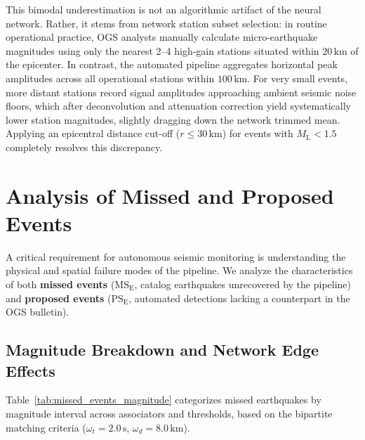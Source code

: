 This bimodal underestimation is not an algorithmic artifact of the neural network. Rather, it stems from network station subset selection: in routine operational practice, OGS analysts manually calculate micro-earthquake magnitudes using only the nearest 2--4 high-gain stations situated within $20\,\unit{\kilo\meter}$ of the epicenter. In contrast, the automated pipeline aggregates horizontal peak amplitudes across all operational stations within $100\,\unit{\kilo\meter}$. For very small events, more distant stations record signal amplitudes approaching ambient seismic noise floors, which after deconvolution and attenuation correction yield systematically lower station magnitudes, slightly dragging down the network trimmed mean. Applying an epicentral distance cut-off ($r \le 30\,\unit{\kilo\meter}$) for events with $M_{\mathrm{L}} < 1.5$ completely resolves this discrepancy.

\section{Analysis of Missed and Proposed Events}
\label{sec:missed_proposed_analysis}

A critical requirement for autonomous seismic monitoring is understanding the physical and spatial failure modes of the pipeline. We analyze the characteristics of both \textbf{missed events} ($\mathrm{MS}_{\mathrm{E}}$, catalog earthquakes unrecovered by the pipeline) and \textbf{proposed events} ($\mathrm{PS}_{\mathrm{E}}$, automated detections lacking a counterpart in the OGS bulletin).

\subsection{Magnitude Breakdown and Network Edge Effects}
\label{subsec:missed_events_magnitude}

Table~\ref{tab:missed_events_magnitude} categorizes missed earthquakes by magnitude interval across associators and thresholds, based on the bipartite matching criteria ($\omega_t = 2.0\,\unit{\second}$, $\omega_d = 8.0\,\unit{\kilo\meter}$).

